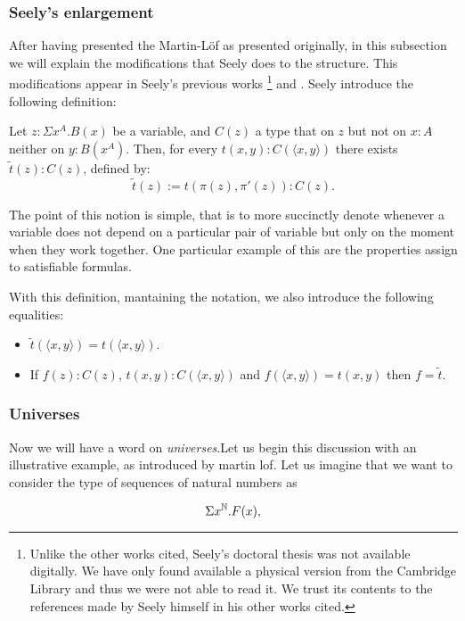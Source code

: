 \subsubsection{Seely's enlargement}

After having presented the Martin-L\"of as presented originally, in this subsection we will explain the modifications that Seely does to the structure. This modifications appear in Seely's previous works \cite{seely1977hyperdoctrines}\footnote{Unlike the other works cited, Seely's doctoral thesis was not available digitally. We have only found available a physical version from the Cambridge Library and thus we were not able to read it. We trust its contents to the references made by Seely himself in his other works cited.} and \cite{seely1983hyperdoctrines}. Seely introduce the following definition:

\begin{definition}
  Let $z : \Sigma x^A.B(x)$ be a variable, and $C(z)$ a type that on $z$ but not on $x:A$ neither on $y:B(x^A)$. Then, for every $t(x,y) : C(\langle x, y\rangle)$ there exists $\tilde t (z) : C(z)$, defined by:
  $$\tilde t (z) := t(\pi(z),\pi'(z)): C(z).$$
\end{definition}

The point of this notion is simple, that is to more succinctly denote whenever a variable does not depend on a particular pair of variable but only on the moment when they work together. One particular example of this are the properties assign to satisfiable formulas.

With this definition, mantaining the notation, we also introduce the following equalities:
\begin{itemize}
\item $\tilde t(\langle x,y\rangle) = t(\langle x,y\rangle) $.
\item If $f(z): C(z)$, $t(x,y):C(\langle x,y\rangle)$ and $f(\langle x,y\rangle) = t(x,y)$ then $f=\tilde t$.

\end{itemize}


\subsubsection{Universes}
Now we will have a word on \emph{universes}.Let us begin this discussion with an illustrative example, as introduced by martin lof. Let us imagine that we want to consider the type of sequences of natural numbers as 

$$\Sigma x^{\mathbb{N}}. F(x),$$


